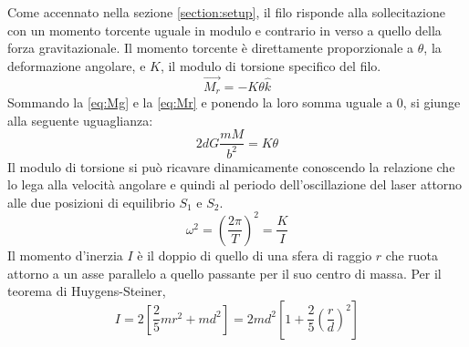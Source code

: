 \documentclass{article}
\begin{document}
Come accennato nella sezione \ref{section:setup}, il filo risponde alla sollecitazione con un momento torcente uguale in modulo e contrario in verso a quello della forza gravitazionale. Il momento torcente è direttamente proporzionale a $\theta$, la deformazione angolare, e $K$, il modulo di torsione specifico del filo.
\begin{equation}\label{eq:Mr}
    \vec{M_r} = -K\theta\hat{k}
\end{equation}
Sommando la \eqref{eq:Mg} e la \eqref{eq:Mr} e ponendo la loro somma uguale a 0, si giunge alla seguente uguaglianza:
\begin{equation}
    2dG\frac{mM}{b^2}=K\theta
\end{equation}
Il modulo di torsione \cite{focardi} si può ricavare dinamicamente conoscendo la relazione che lo lega alla velocità angolare e quindi al periodo dell'oscillazione del laser attorno alle due posizioni di equilibrio $S_1$ e $S_2$.
\begin{equation}
    \omega ^ 2 = \left(\frac{2\pi}{T}\right)^2 = \frac{K}{I}
\end{equation}
Il momento d'inerzia $I$ è il doppio di quello di una sfera di raggio $r$ che ruota attorno a un asse parallelo a quello passante per il suo centro di massa. Per il teorema di Huygens-Steiner\cite{focardi},
\begin{equation}
    I = 2\left[\frac{2}{5}mr^2 + md^2\right] = 2md^2\left[1 + \frac{2}{5}\left(\frac{r}{d}\right) ^ 2 \right]
\end{equation}

\newpage
\end{document}

